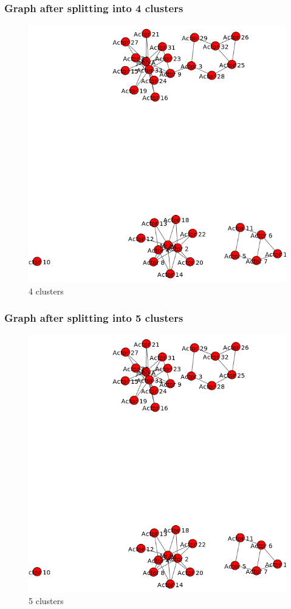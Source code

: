 \subsubsection{Graph after splitting into 4 clusters}
\begin{figure}[ht]    
    \begin{center}
        \includegraphics[scale=0.7]{output3.png}
        \caption{4 clusters}
        \label{e5}
    \end{center}
\end{figure}
\newpage
\subsubsection{Graph after splitting into 5 clusters}
\begin{figure}[ht]    
    \begin{center}
        \includegraphics[scale=0.7]{output4.png}
        \caption{5 clusters}
        \label{f6}
    \end{center}
\end{figure}
\newpage
